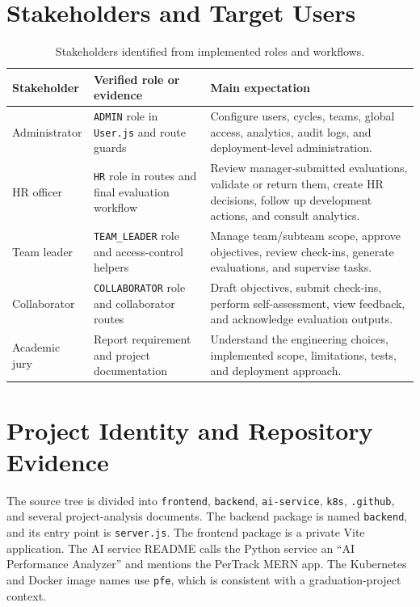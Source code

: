 \section{Stakeholders and Target Users}
\begin{table}[H]\centering\small
\caption{Stakeholders identified from implemented roles and workflows.}
\label{tab:stakeholders}
\begin{tabularx}{\textwidth}{p{}p{}Y}
\toprule
Stakeholder & Verified role or evidence & Main expectation\\
\midrule
Administrator & \texttt{ADMIN} role in \texttt{User.js} and route guards & Configure users, cycles, teams, global access, analytics, audit logs, and deployment-level administration.\\
HR officer & \texttt{HR} role in routes and final evaluation workflow & Review manager-submitted evaluations, validate or return them, create HR decisions, follow up development actions, and consult analytics.\\
Team leader & \texttt{TEAM\_LEADER} role and access-control helpers & Manage team/subteam scope, approve objectives, review check-ins, generate evaluations, and supervise tasks.\\
Collaborator & \texttt{COLLABORATOR} role and collaborator routes & Draft objectives, submit check-ins, perform self-assessment, view feedback, and acknowledge evaluation outputs.\\
Academic jury & Report requirement and project documentation & Understand the engineering choices, implemented scope, limitations, tests, and deployment approach.\\
\bottomrule
\end{tabularx}
\end{table}

\section{Project Identity and Repository Evidence}
The source tree is divided into \texttt{frontend}, \texttt{backend}, \texttt{ai-service}, \texttt{k8s}, \texttt{.github}, and several project-analysis documents. The backend package is named \texttt{backend}, and its entry point is \texttt{server.js}. The frontend package is a private Vite application. The AI service README calls the Python service an ``AI Performance Analyzer'' and mentions the PerTrack MERN app. The Kubernetes and Docker image names use \texttt{pfe}, which is consistent with a graduation-project context.

